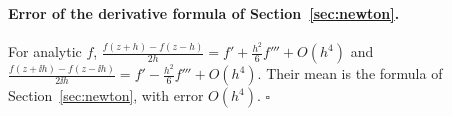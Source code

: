 \paragraph{Error of the derivative formula of Section~\ref{sec:newton}.}
For analytic $f$, $\frac{f(z+h)-f(z-h)}{2h}=f'+\frac{h^2}{6}f'''+O(h^4)$ and
$\frac{f(z+\ii h)-f(z-\ii h)}{2\ii h}=f'-\frac{h^2}{6}f'''+O(h^4)$. Their mean
is the formula of Section~\ref{sec:newton}, with error $O(h^4)$.
\hfill$\square$
